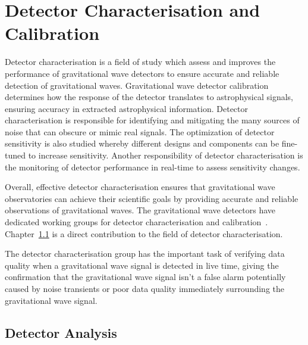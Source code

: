 \section{\label{}Detector Characterisation and Calibration}

Detector characterisation is a field of study which assess and improves the performance of gravitational wave detectors to ensure accurate and reliable detection of gravitational waves. Gravitational wave detector calibration determines how the response of the detector translates to astrophysical signals, ensuring accuracy in extracted astrophysical information. Detector characterisation is responsible for identifying and mitigating the many sources of noise that can obscure or mimic real signals. The optimization of detector sensitivity is also studied whereby different designs and components can be fine-tuned to increase sensitivity. Another responsibility of detector characterisation is the monitoring of detector performance in real-time to assess sensitivity changes.

Overall, effective detector characterisation ensures that gravitational wave observatories can achieve their scientific goals by providing accurate and reliable observations of gravitational waves. The gravitational wave detectors have dedicated working groups for detector characterisation and calibration~\cite{O2O3_DetChar:2021, VirgoDetChar:2023}. Chapter~\ref{} is a direct contribution to the field of detector characterisation.

The detector characterisation group has the important task of verifying data quality when a gravitational wave signal is detected in live time, giving the confirmation that the gravitational wave signal isn't a false alarm potentially caused by noise transients or poor data quality immediately surrounding the gravitational wave signal.

\subsection{\label{3:sec:detector-analysis}Detector Analysis}


